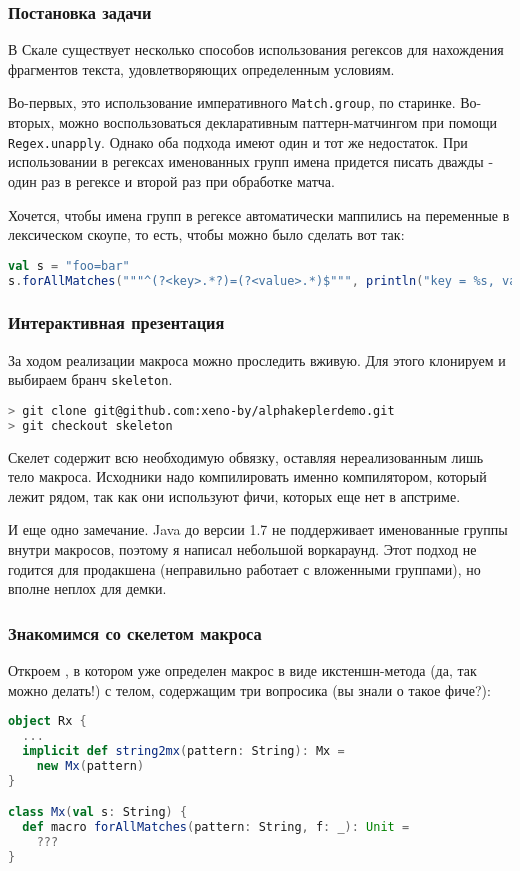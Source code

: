 \documentclass[hyperref={bookmarks=false}]{beamer}
\begin{document}
\begin{frame}[t,fragile]
\frametitle{Постановка задачи}

В Скале существует несколько способов использования регексов для нахождения фрагментов текста, удовлетворяющих определенным условиям.

Во-первых, это использование императивного \texttt{Match.group}, по старинке. Во-вторых, можно воспользоваться декларативным паттерн-матчингом при помощи \texttt{Regex.unapply}. Однако оба подхода имеют один и тот же недостаток. При использовании в регексах именованных групп имена придется писать дважды - один раз в регексе и второй раз при обработке матча.

Хочется, чтобы имена групп в регексе автоматически маппились на переменные в лексическом скоупе, то есть, чтобы можно было сделать вот так:

\begin{lstlisting}[language=scala]
val s = "foo=bar"
s.forAllMatches("""^(?<key>.*?)=(?<value>.*)$""", println("key = %s, value = %s".format(key, value)))
\end{lstlisting}%
\end{frame}

\begin{frame}[t,fragile]
\frametitle{Интерактивная презентация}

За ходом реализации макроса можно проследить вживую. Для этого клонируем  и выбираем бранч \texttt{skeleton}.

\begin{lstlisting}[language=bash]
> git clone git@github.com:xeno-by/alphakeplerdemo.git
> git checkout skeleton
\end{lstlisting}

Скелет содержит всю необходимую обвязку, оставляя нереализованным лишь тело макроса. Исходники надо компилировать именно компилятором, который лежит рядом, так как они используют фичи, которых еще нет в апстриме.

И еще одно замечание. Java до версии 1.7 не поддерживает именованные группы внутри макросов, поэтому я написал небольшой воркараунд. Этот подход не годится для продакшена (неправильно работает с вложенными группами), но вполне неплох для демки.
\end{frame}

\begin{frame}[t,fragile]
\frametitle{Знакомимся со скелетом макроса}

Откроем , в котором уже определен макрос в виде икстеншн-метода (да, так можно делать!) с телом, содержащим три вопросика (вы знали о такое фиче?):

\begin{lstlisting}[language=scala]
object Rx {
  ...
  implicit def string2mx(pattern: String): Mx =
    new Mx(pattern)
}

class Mx(val s: String) {
  def macro forAllMatches(pattern: String, f: _): Unit =
    ???
}
\end{lstlisting}
\end{frame}
\end{document}
